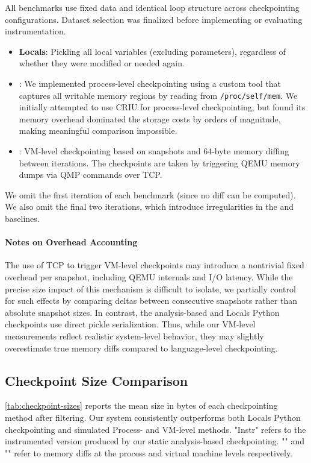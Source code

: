 All benchmarks use fixed data and identical loop structure across checkpointing configurations. Dataset selection was finalized before implementing or evaluating instrumentation.

\begin{itemize}
  \item \textbf{Locals}: Pickling all local variables (excluding parameters), regardless of whether they were modified or needed again.
  \item \textbf{\PROCDIFF}: We implemented process-level checkpointing using a custom tool that captures all writable memory regions by reading from \texttt{/proc/self/mem}. We initially attempted to use CRIU for process-level checkpointing, but found its memory overhead dominated the storage costs by orders of magnitude, making meaningful comparison impossible. 
  \item \textbf{\VMDIFF}: VM-level checkpointing based on snapshots and 64-byte memory diffing between iterations. The checkpoints are taken by triggering QEMU memory dumps via QMP commands over TCP.
\end{itemize}

We omit the first iteration of each benchmark (since no diff can be computed). We also omit the final two iterations, which introduce irregularities in the {\PROCDIFF} and {\VMDIFF} baselines.

\paragraph{Notes on Overhead Accounting}
The use of TCP to trigger VM-level checkpoints may introduce a nontrivial fixed overhead per snapshot, including QEMU internals and I/O latency. While the precise size impact of this mechanism is difficult to isolate, we partially control for such effects by comparing deltas between consecutive snapshots rather than absolute snapshot sizes. In contrast, the analysis-based and Locals Python checkpoints use direct pickle serialization. Thus, while our VM-level measurements reflect realistic system-level behavior, they may slightly overestimate true memory diffs compared to language-level checkpointing.

\subsection{Checkpoint Size Comparison}

\autoref{tab:checkpoint-sizes} reports the mean size in bytes of each checkpointing method after filtering. Our system consistently outperforms both Locals Python checkpointing and simulated Process- and VM-level methods. "Instr" refers to the instrumented version produced by our static analysis-based checkpointing. "\PROCDIFF" and "\VMDIFF" refer to memory diffs at the process and virtual machine levels respectively.

